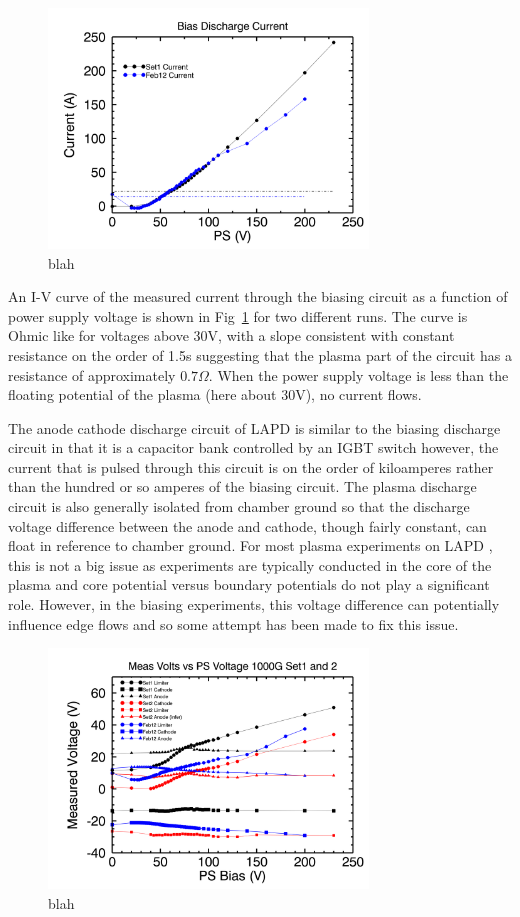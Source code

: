 \documentclass[aip,pop,amsmath,amssymb,preprint,superscriptaddress]{revtex4-1} %
\begin{document}
\begin{figure}[!htbp]
\centerline{
\includegraphics[width=8.5cm]{IV_curves}}
\caption{\label{fig:IV_curves} blah}
\end{figure}

An I-V curve of the measured current through the biasing circuit as a function of power supply voltage is shown in Fig~\ref{fig:IV_curves} for two different runs. The curve is Ohmic like for voltages above 30V, with a slope consistent with constant resistance on the order of 1.5\Omega s suggesting that the plasma part of the circuit has a resistance of approximately $0.7\Omega$. When the power supply voltage is less than the floating potential of the plasma (here about 30V), no current flows.

The anode cathode discharge circuit of LAPD is similar to the biasing discharge circuit in that it is a capacitor bank controlled by an IGBT switch however, the current that is pulsed through this circuit is on the order of kiloamperes rather than the hundred or so amperes of the biasing circuit. The plasma discharge circuit is also generally isolated from chamber ground so that the discharge voltage difference between the anode and cathode, though fairly constant, can float in reference to chamber ground. For most plasma experiments on LAPD , this is  not a big issue as experiments are typically conducted in the core of the plasma and core potential versus boundary potentials do not play a significant role. However, in the biasing experiments, this voltage difference can potentially influence edge flows and so some attempt has been made to fix this issue.

\begin{figure}[!htbp]
\centerline{
\includegraphics[width=8.5cm]{an_cath}}
\caption{\label{fig:an_cath} blah}
\end{figure}
\end{document}
